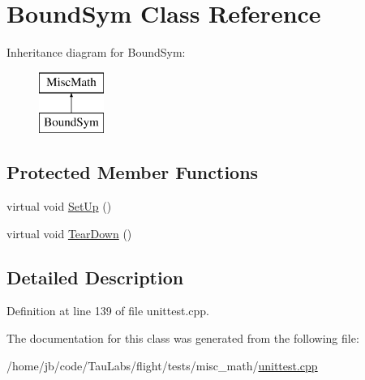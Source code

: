 \hypertarget{class_bound_sym}{\section{\-Bound\-Sym \-Class \-Reference}
\label{class_bound_sym}
}
\-Inheritance diagram for \-Bound\-Sym\-:\begin{figure}[H]
\begin{center}
\leavevmode
\includegraphics[height=2.000000cm]{class_bound_sym}
\end{center}
\end{figure}
\subsection*{\-Protected \-Member \-Functions}
\begin{DoxyCompactItemize}
\item 
virtual void \hyperlink{group___unit_tests_ga3b1ffcc33db9c2489206486310736009}{\-Set\-Up} ()
\item 
virtual void \hyperlink{group___unit_tests_gac3c27344e8473b0cfba42ddd7e28b509}{\-Tear\-Down} ()
\end{DoxyCompactItemize}


\subsection{\-Detailed \-Description}


\-Definition at line 139 of file unittest.\-cpp.



\-The documentation for this class was generated from the following file\-:\begin{DoxyCompactItemize}
\item 
/home/jb/code/\-Tau\-Labs/flight/tests/misc\-\_\-math/\hyperlink{misc__math_2unittest_8cpp}{unittest.\-cpp}\end{DoxyCompactItemize}
